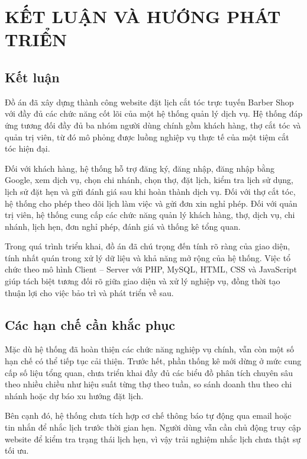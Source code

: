 \chapter{KẾT LUẬN VÀ HƯỚNG PHÁT TRIỂN}

\section{Kết luận}

Đồ án đã xây dựng thành công website đặt lịch cắt tóc trực tuyến Barber
Shop với đầy đủ các chức năng cốt lõi của một hệ thống quản lý dịch vụ.
Hệ thống đáp ứng tương đối đầy đủ ba nhóm người dùng chính gồm khách
hàng, thợ cắt tóc và quản trị viên, từ đó mô phỏng được luồng nghiệp vụ
thực tế của một tiệm cắt tóc hiện đại.

Đối với khách hàng, hệ thống hỗ trợ đăng ký, đăng nhập, đăng nhập bằng
Google, xem dịch vụ, chọn chi nhánh, chọn thợ, đặt lịch, kiểm tra lịch
sử dụng, lịch sử đặt hẹn và gửi đánh giá sau khi hoàn thành dịch vụ.
Đối với thợ cắt tóc, hệ thống cho phép theo dõi lịch làm việc và gửi đơn
xin nghỉ phép. Đối với quản trị viên, hệ thống cung cấp các chức năng
quản lý khách hàng, thợ, dịch vụ, chi nhánh, lịch hẹn, đơn nghỉ phép,
đánh giá và thống kê tổng quan.

Trong quá trình triển khai, đồ án đã chú trọng đến tính rõ ràng của giao
diện, tính nhất quán trong xử lý dữ liệu và khả năng mở rộng của hệ
thống. Việc tổ chức theo mô hình Client -- Server với PHP, MySQL, HTML,
CSS và JavaScript giúp tách biệt tương đối rõ giữa giao diện và xử lý
nghiệp vụ, đồng thời tạo thuận lợi cho việc bảo trì và phát triển về sau.

\section{Các hạn chế cần khắc phục}

Mặc dù hệ thống đã hoàn thiện các chức năng nghiệp vụ chính, vẫn còn một
số hạn chế có thể tiếp tục cải thiện. Trước hết, phần thống kê mới dừng
ở mức cung cấp số liệu tổng quan, chưa triển khai đầy đủ các biểu đồ
phân tích chuyên sâu theo nhiều chiều như hiệu suất từng thợ theo tuần,
so sánh doanh thu theo chi nhánh hoặc dự báo xu hướng đặt lịch.

Bên cạnh đó, hệ thống chưa tích hợp cơ chế thông báo tự động qua email
hoặc tin nhắn để nhắc lịch trước thời gian hẹn. Người dùng vẫn cần chủ
động truy cập website để kiểm tra trạng thái lịch hẹn, vì vậy trải
nghiệm nhắc lịch chưa thật sự tối ưu.

